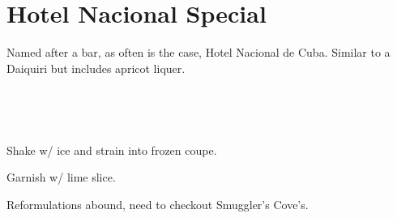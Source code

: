\section[Hotel Nacional]{
    Hotel Nacional Special
}

\begin{recipestats}[
        servings=1,
        preptime=5 \minute,
        original=\citeauthor{potionsCaribbeanBerry}~\cite{potionsCaribbeanBerry},
    ]
\end{recipestats}

\begin{recipeabstract}
    Named after a bar, as often is the case, Hotel Nacional de Cuba.
    Similar to a Daiquiri but includes apricot liquer.
\end{recipeabstract}


\begin{ingredientcolumns}
    \begin{ingredientblock}
        \\
    \end{ingredientblock}

    \begin{ingredientblock}
        \\
    \end{ingredientblock}
\end{ingredientcolumns}

\begin{preparation}
\item Shake w/ ice and strain into frozen coupe.
\item Garnish w/ lime slice.
\end{preparation}

\begin{experiments}
\item Reformulations abound, need to checkout Smuggler's Cove's.
\end{experiments}

\recipeend%
